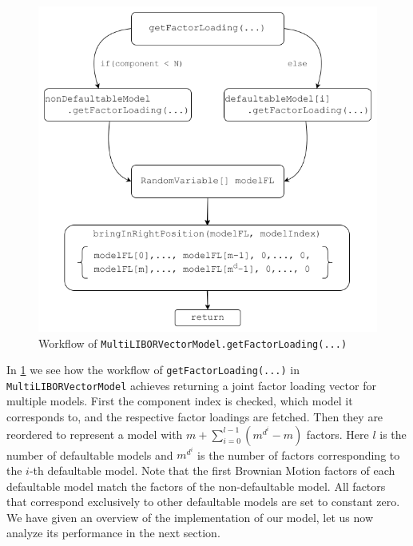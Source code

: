 \documentclass[12pt]{article}
\begin{document}
	\begin{figure}[h]
		\centering
		\includegraphics[width=0.6\linewidth]{figures/MultiModelGetFactorLoading}
		\caption[Workflow of \texttt{MultiLIBORVectorModel.getFactorLoading(...)}]{Workflow of \texttt{MultiLIBORVectorModel.getFactorLoading(...)}}
		\label{fig:multimodelgetfactorloading}
	\end{figure}
	
	In \cref{fig:multimodelgetfactorloading} we see how the workflow of \texttt{getFactorLoading(...)} in \texttt{MultiLIBORVectorModel} achieves returning a joint factor loading vector for multiple models. First the component index is checked, which model it corresponds to, and the respective factor loadings are fetched. Then they are reordered to represent a model with $m + \sum_{i=0}^{l-1}\left(m^{d^i}-m\right)$ factors. Here $l$ is the number of defaultable models and $m^{d^i}$ is the number of factors corresponding to the $i$-th defaultable model. Note that the first Brownian Motion factors of each defaultable model match the factors of the non-defaultable model. All factors that correspond exclusively to other defaultable models are set to constant zero.\\
	
	We have given an overview of the implementation of our model, let us now analyze its performance in the next section.
	
	
	\pagebreak
\end{document}
